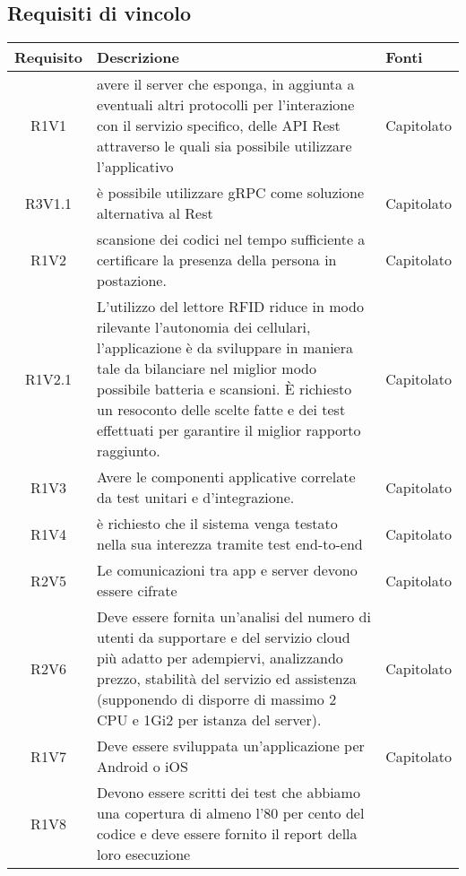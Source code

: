 \subsection{Requisiti di vincolo}
\begin{center}
	\begin{longtable}{|c|p{10cm}|p{4cm}|}
		\hline
		\rowcolor{lighter-grayer}
		\textbf{Requisito} & \textbf{Descrizione} & \textbf{Fonti}  \\
		\hline
		\endfirsthead
		
		 R1V1 &avere il server che esponga, in aggiunta a eventuali altri protocolli per l’interazione con il servizio specifico, delle API Rest attraverso le quali sia possibile utilizzare l'applicativo &Capitolato \\
		\hline
		R3V1.1&è possibile utilizzare gRPC come soluzione alternativa al Rest	& Capitolato	\\
		\hline
R1V2&scansione dei codici nel tempo sufficiente a certificare la presenza  della persona in postazione.	& Capitolato	\\
		\hline
R1V2.1&L’utilizzo del lettore RFID riduce in modo rilevante l’autonomia dei cellulari, l’applicazione è da sviluppare in maniera tale da bilanciare nel miglior modo possibile batteria e scansioni. È richiesto un resoconto delle scelte fatte e dei test effettuati per garantire il miglior rapporto raggiunto.	& Capitolato	\\
		\hline
		R1V3&Avere le componenti applicative correlate da test unitari e d’integrazione.	& Capitolato	\\
		\hline
R1V4&è richiesto che il sistema venga testato nella sua interezza tramite test end-to-end	& Capitolato	\\
		\hline
R2V5&Le comunicazioni tra app e server devono essere cifrate	& Capitolato	\\
		\hline
		R2V6&	Deve essere fornita un'analisi del numero di utenti da supportare e del servizio cloud più adatto per adempiervi, analizzando prezzo, stabilità del servizio ed assistenza (supponendo di disporre di massimo 2 CPU e 1Gi2 per istanza del server).& Capitolato	\\
		\hline
R1V7&Deve essere sviluppata un'applicazione per Android o iOS	& Capitolato	\\
		\hline
R1V8&Devono essere scritti dei test che abbiamo una copertura di almeno l'80 per cento del codice e deve essere fornito il report della loro esecuzione	& 	\\
		\hline


\end{longtable}
\end{center}
